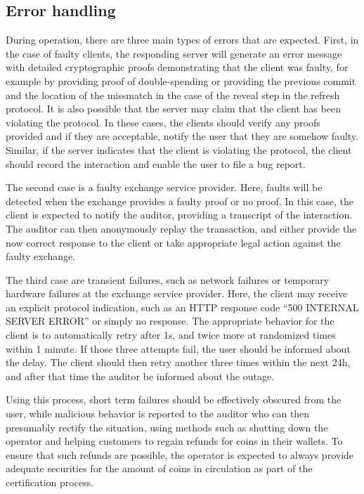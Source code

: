 \documentclass{llncs}
\begin{document}
\subsection{Error handling}

During operation, there are three main types of errors that are
expected.  First, in the case of faulty clients, the responding server
will generate an error message with detailed cryptographic proofs
demonstrating that the client was faulty, for example by providing
proof of double-spending or providing the previous commit and the
location of the missmatch in the case of the reveal step in the
refresh protocol.  It is also possible that the server may claim that
the client has been violating the protocol.  In these cases, the
clients should verify any proofs provided and if they are acceptable,
notify the user that they are somehow faulty.  Similar, if the
server indicates that the client is violating the protocol, the
client should record the interaction and enable the user to file a
bug report.

The second case is a faulty exchange service provider.  Here, faults
will be detected when the exchange provides a faulty proof or no
proof.  In this case, the client is expected to notify the auditor,
providing a transcript of the interaction.  The auditor can then
anonymously replay the transaction, and either provide the now correct
response to the client or take appropriate legal action against the
faulty exchange.

The third case are transient failures, such as network failures or
temporary hardware failures at the exchange service provider.  Here, the
client may receive an explicit protocol indication, such as an HTTP
response code ``500 INTERNAL SERVER ERROR'' or simply no response.
The appropriate behavior for the client is to automatically retry
after 1s, and twice more at randomized times within 1 minute.
If those three attempts fail, the user should be informed about the
delay.  The client should then retry another three times within the
next 24h, and after that time the auditor be informed about the outage.

Using this process, short term failures should be effectively obscured
from the user, while malicious behavior is reported to the auditor who
can then presumably rectify the situation, using methods such as
shutting down the operator and helping customers to regain refunds for
coins in their wallets.  To ensure that such refunds are possible, the
operator is expected to always provide adequate securities for the
amount of coins in circulation as part of the certification process.
\end{document}
